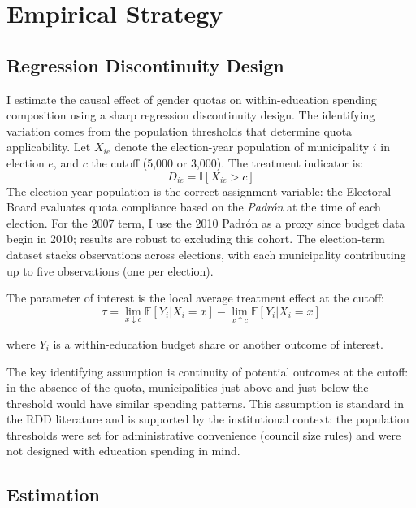 \documentclass[12pt]{article}
\newcommand{\E}{\mathbb{E}}
\newcommand{\ind}{\mathbb{I}}
\begin{document}



\section{Empirical Strategy}

\subsection{Regression Discontinuity Design}

I estimate the causal effect of gender quotas on within-education spending composition using a sharp regression discontinuity design. The identifying variation comes from the population thresholds that determine quota applicability. Let $X_{ie}$ denote the election-year population of municipality $i$ in election $e$, and $c$ the cutoff (5,000 or 3,000). The treatment indicator is:
\begin{equation}
    D_{ie} = \ind[X_{ie} > c]
\end{equation}
The election-year population is the correct assignment variable: the Electoral Board evaluates quota compliance based on the \emph{Padr\'{o}n} at the time of each election. For the 2007 term, I use the 2010 Padr\'{o}n as a proxy since budget data begin in 2010; results are robust to excluding this cohort. The election-term dataset stacks observations across elections, with each municipality contributing up to five observations (one per election).

The parameter of interest is the local average treatment effect at the cutoff:
\begin{equation}
    \tau = \lim_{x \downarrow c} \E[Y_i | X_i = x] - \lim_{x \uparrow c} \E[Y_i | X_i = x]
\end{equation}

where $Y_i$ is a within-education budget share or another outcome of interest.

The key identifying assumption is continuity of potential outcomes at the cutoff: in the absence of the quota, municipalities just above and just below the threshold would have similar spending patterns. This assumption is standard in the RDD literature \citep{imbens2008regression, lee2010regression} and is supported by the institutional context: the population thresholds were set for administrative convenience (council size rules) and were not designed with education spending in mind.

\subsection{Estimation}
\end{document}
